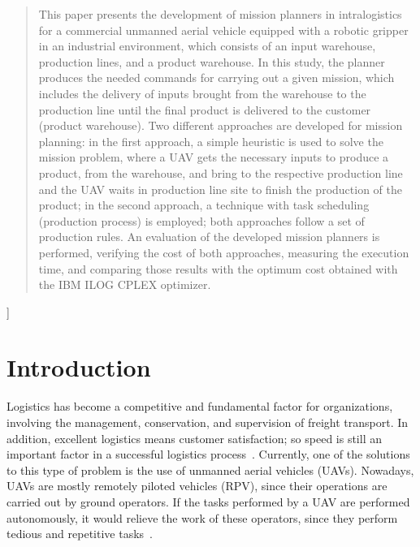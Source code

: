\documentclass[conference,harvard,brazil,english]{sbatex}
\begin{document}
\begin{abstract}
This paper presents the development of mission planners in intralogistics for a commercial unmanned aerial vehicle equipped with a robotic gripper in an industrial environment, which consists of an input warehouse, production lines, and a product warehouse. In this study, the planner produces the needed commands for carrying out a given mission, which includes the delivery of inputs brought from the warehouse to the production line until the final product is delivered to the customer (product warehouse). Two different approaches are developed for mission planning: in the first approach, a simple heuristic is used to solve the mission problem, where a UAV gets the necessary inputs to produce a product, from the warehouse, and bring to the respective production line and the UAV waits in production line site to finish the production of the product; in the second approach, a technique with task scheduling (production process) is employed; both approaches follow a set of production rules. An evaluation of the developed mission planners is performed, verifying the cost of both approaches, measuring the execution time, and comparing those results with the optimum cost obtained with the IBM ILOG CPLEX optimizer.
\end{abstract}
]


\section{Introduction}
\label{sec:introduction}


Logistics has become a competitive and fundamental factor for organizations, involving the management, conservation, and supervision of freight transport. In addition, excellent logistics means customer satisfaction; so speed is still an important factor in a successful logistics process~\cite{drone4logistic}. Currently, one of the solutions to this type of problem is the use of unmanned aerial vehicles (UAVs). Nowadays, UAVs are mostly remotely piloted vehicles (RPV), since their operations are carried out by ground operators. If the tasks performed by a UAV are performed autonomously, it would relieve the work of these operators, since they perform tedious and repetitive tasks~\cite{pascarella2013autonomic}.
\end{document}
